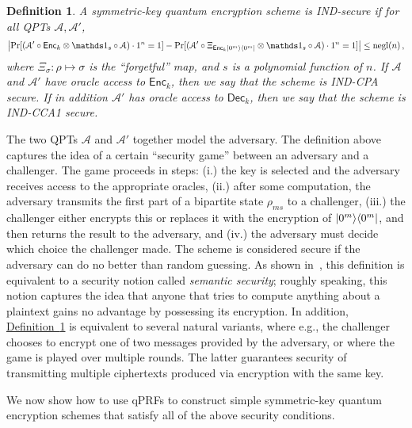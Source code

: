 \documentclass[11pt]{article}
\numberwithin{equation}{section}
\newtheorem{definition}{Definition}
\newcommand{\one}{\mathds 1}
\newcommand{\opn}{\operatorname}
\newcommand{\expref}[2]{\texorpdfstring{\hyperref[#2]{#1~\ref{#2}}}{#1~\ref{#2}}}
\newcommand{\algo}{\mathcal}
\newcommand{\negl}{\opn{negl}}
\newcommand{\Enc}{\ensuremath{\mathsf{Enc}}\xspace}
\newcommand{\Dec}{\ensuremath{\mathsf{Dec}}\xspace}
\newcommand{\prob}{\opn{Pr}}
\begin{document}
{\begin{definition}\label{def:IND}
A symmetric-key quantum encryption scheme is IND-secure if for all QPTs $\algo A, \algo A'$,
$$
\left|\prob[ (\algo A' \circ \Enc_k \otimes \one_s \circ \algo A) \cdot 1^n = 1] -
\prob[ (\algo A' \circ \Xi_{\Enc_k \ket{0^m}\bra{0^m}} \otimes \one_s \circ \algo A) \cdot 1^n = 1] \right|
\leq \negl(n)\,,
$$ 
where $\Xi_\sigma: \rho \mapsto \sigma$ is the ``forgetful'' map, and $s$ is a polynomial function of $n$. If $\algo A$ and $\algo A'$ have oracle access to $\Enc_k$, then we say that the scheme is IND-CPA secure. If in addition $\algo A'$ has oracle access to $\Dec_k$, then we say that the scheme is IND-CCA1 secure.
\end{definition}

The two QPTs $\algo A$ and $\algo A'$ together model the adversary. The definition above captures the idea of a certain ``security game'' between an adversary and a challenger. The game proceeds in steps: (i.) the key is selected and the adversary receives access to the appropriate oracles, (ii.) after some computation, the adversary transmits the first part of a bipartite state $\rho_{ms}$ to a challenger, (iii.) the challenger either encrypts this or replaces it with the encryption of ${\left\vert{0^m}\right\rangle}{\left\langle{0^m}\right\vert}$, and then returns the result to the adversary, and (iv.) the adversary must decide which choice the challenger made. The scheme is considered secure if the adversary can do no better than random guessing. As shown in~\cite{ABFGSS16}, this definition is equivalent to a security notion called \emph{semantic security}; roughly speaking, this notion captures the idea that anyone that tries to compute anything about a plaintext gains no advantage by possessing its encryption. In addition, \expref{Definition}{def:IND} is equivalent to several natural variants, where e.g., the challenger chooses to encrypt one of two messages provided by the adversary, or where the game is played over multiple rounds. The latter guarantees security of transmitting multiple ciphertexts produced via encryption with the same key.

We now show how to use qPRFs to construct simple symmetric-key quantum encryption schemes that satisfy all of the above security conditions.

}
\end{document}

